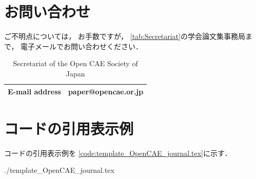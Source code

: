 \documentclass{../../style/ltjoc}
\begin{document}
\section{お問い合わせ}
ご不明点については，
お手数ですが，
\autoref{tab:Secretariat}の学会論文集事務局まで，
電子メールでお問い合わせください．
\begin{table}[htbp]
  \centering
  \begin{tabular}{l|l}
    \hline
    E-mail address & paper@opencae.or.jp\\
    \hline
    \end{tabular}
  \caption{Secretariat of the Open CAE Society of Japan}
  \label{tab:Secretariat}
\end{table}

%
%
\clearpage
\appendix
\section{コードの引用表示例}
%
コードの引用表示例を
\autoref{code:template_OpenCAE_journal.tex}に示す．
%

{{./template_OpenCAE_journal.tex}}
%
\end{document}

